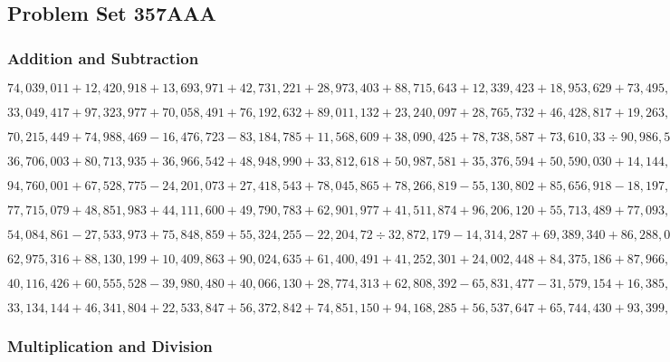 \hypertarget{problem-set-357aaa}{%
\subsection{Problem Set 357AAA}\label{problem-set-357aaa}}

\hypertarget{addition-and-subtraction}{%
\subsubsection{Addition and
Subtraction}\label{addition-and-subtraction}}

\(74,039,011+12,420,918+13,693,971+42,731,221+28,973,403+88,715,643+12,339,423+18,953,629+73,495,890+59,712,837\)

\(33,049,417+97,323,977+70,058,491+76,192,632+89,011,132+23,240,097+28,765,732+46,428,817+19,263,626+88,692,626\)

\(70,215,449+74,988,469-16,476,723-83,184,785+11,568,609+38,090,425+78,738,587+73,610,33÷90,986,531-36,801,427\)

\(36,706,003+80,713,935+36,966,542+48,948,990+33,812,618+50,987,581+35,376,594+50,590,030+14,144,665+42,284,058\)

\(94,760,001+67,528,775-24,201,073+27,418,543+78,045,865+78,266,819-55,130,802+85,656,918-18,197,688-77,006,918\)

\(77,715,079+48,851,983+44,111,600+49,790,783+62,901,977+41,511,874+96,206,120+55,713,489+77,093,325+59,721,806\)

\(54,084,861-27,533,973+75,848,859+55,324,255-22,204,72÷32,872,179-14,314,287+69,389,340+86,288,059+61,780,281\)

\(62,975,316+88,130,199+10,409,863+90,024,635+61,400,491+41,252,301+24,002,448+84,375,186+87,966,224+43,968,376\)

\(40,116,426+60,555,528-39,980,480+40,066,130+28,774,313+62,808,392-65,831,477-31,579,154+16,385,662-76,168,172\)

\(33,134,144+46,341,804+22,533,847+56,372,842+74,851,150+94,168,285+56,537,647+65,744,430+93,399,310+62,677,960\)

\hypertarget{multiplication-and-division}{%
\subsubsection{Multiplication and
Division}\label{multiplication-and-division}}

